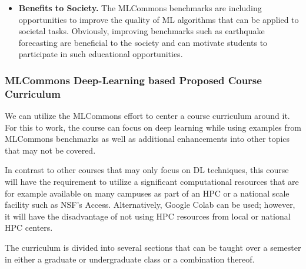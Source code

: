 \documentclass[utf8]{FrontiersinVancouver} %
\begin{document}
\begin{itemize}
\item {\bf Benefits to Society.} The MLCommons benchmarks are
  including opportunities to improve the quality of ML algorithms that
  can be applied to societal tasks. Obviously, improving benchmarks
  such as earthquake forecasting are beneficial to the society and can
  motivate students to participate in such educational opportunities.

\end{itemize}


\subsubsection{MLCommons Deep-Learning based Proposed Course Curriculum}

We can utilize the MLCommons effort to center a course curriculum
around it. For this to work, the course can focus on deep learning
while using examples from MLCommons benchmarks as well as additional
enhancements into other topics that may not be covered.

In contrast to other courses that may only focus on DL techniques,
this course will have the requirement to utilize a significant
computational resources that are for example available on many
campuses as part of an HPC or a national scale facility such as NSF's
Access. Alternatively, Google Colab can be used; however, it will have
the disadvantage of not using HPC resources from local or national HPC
centers.

The curriculum is divided into several sections that can be taught
over a semester in either a graduate or undergraduate class or a
combination thereof.
\end{document}
